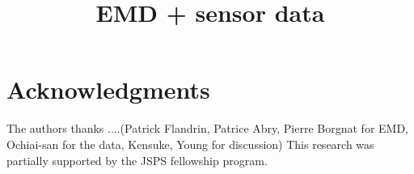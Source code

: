 \documentclass[conference]{IEEEtran}
\begin{document}
\title{EMD + sensor data}


\author{
\and
{}
\and
{}
}


\maketitle

% 
% 










\section*{Acknowledgments}
The authors thanks ....(Patrick Flandrin, Patrice Abry, Pierre Borgnat for EMD, Ochiai-san for the data, Kensuke, Young for discussion)
This research was partially supported by the JSPS fellowship program.



\end{document}
